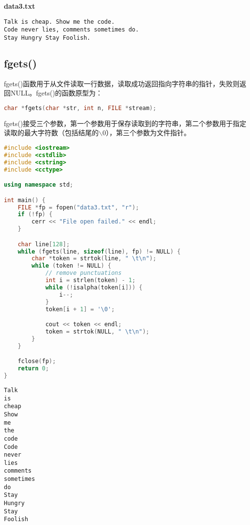 \begin{tcolorbox}
    \textbf{data3.txt}
    \begin{verbatim}
Talk is cheap. Show me the code.
Code never lies, comments sometimes do.
Stay Hungry Stay Foolish.
	\end{verbatim}
\end{tcolorbox}

\vspace{0.5cm}

\subsection{fgets()}

fgets()函数用于从文件读取一行数据，读取成功返回指向字符串的指针，失败则返回NULL。fgets()的函数原型为：

\vspace{-0.5cm}

\begin{lstlisting}[language=C++]
char *fgets(char *str, int n, FILE *stream);
\end{lstlisting}

fgets()接受三个参数，第一个参数用于保存读取到的字符串，第二个参数用于指定读取的最大字符数（包括结尾的$ \backslash $0），第三个参数为文件指针。\\


\begin{lstlisting}[language=C++]
#include <iostream>
#include <cstdlib>
#include <cstring>
#include <cctype>

using namespace std;

int main() {
    FILE *fp = fopen("data3.txt", "r");
    if (!fp) {
        cerr << "File open failed." << endl;
    }

    char line[128];
    while (fgets(line, sizeof(line), fp) != NULL) {
        char *token = strtok(line, " \t\n");
        while (token != NULL) {
            // remove punctuations
            int i = strlen(token) - 1;
            while (!isalpha(token[i])) {
                i--;
            }
            token[i + 1] = '\0';

            cout << token << endl;
            token = strtok(NULL, " \t\n");
        }
    }

    fclose(fp);
    return 0;
}
\end{lstlisting}

\begin{tcolorbox}
    \begin{verbatim}
Talk
is
cheap
Show
me
the
code
Code
never
lies
comments
sometimes
do
Stay
Hungry
Stay
Foolish
	\end{verbatim}
\end{tcolorbox}

